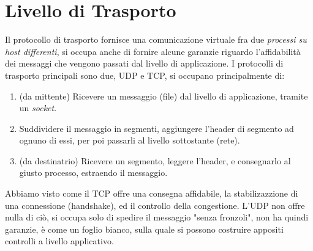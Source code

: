 \documentclass[12pt, letterpaper]{article}
\begin{document}
\section{Livello di Trasporto}
Il protocollo di trasporto fornisce una comunicazione virtuale fra due \textit{processi su host
    differenti}, si occupa anche di fornire alcune garanzie riguardo l'affidabilità dei messaggi che vengono
passati dal livello di applicazione. I protocolli di trasporto principali sono due, UDP e TCP, si occupano
principalmente di:\begin{enumerate}
    \item (da mittente) Ricevere un messaggio (file) dal livello di applicazione, tramite un \textit{socket}.
    \item Suddividere il messaggio in segmenti, aggiungere l'header di segmento ad ognuno di essi, per
          poi passarli al livello sottostante (rete).
    \item (da destinatrio) Ricevere un segmento, leggere l'header, e consegnarlo al giusto processo,
          estraendo il messaggio.
\end{enumerate}
Abbiamo visto come il TCP offre una consegna affidabile, la stabilizazzione di una connessione (handshake),
ed il controllo della congestione. L'UDP non offre nulla di ciò, si occupa solo di spedire il messaggio
"senza fronzoli", non ha quindi garanzie, è come un foglio bianco, sulla quale si possono costruire appositi
controlli a livello applicativo.
\end{document}
